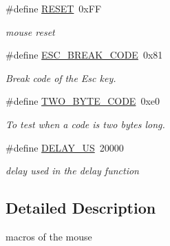 \begin{DoxyCompactItemize}
\mbox{\label{group__mouse__macros_gab702106cf3b3e96750b6845ded4e0299}} 
\#define \hyperlink{group__mouse__macros_gab702106cf3b3e96750b6845ded4e0299}{R\+E\+S\+ET}~0x\+FF
\begin{DoxyCompactList}\small\item\em mouse reset \end{DoxyCompactList}\item 
\mbox{\label{group__mouse__macros_ga592dfdf397b21913348b4dd6b7759b2d}} 
\#define \hyperlink{group__mouse__macros_ga592dfdf397b21913348b4dd6b7759b2d}{E\+S\+C\+\_\+\+B\+R\+E\+A\+K\+\_\+\+C\+O\+DE}~0x81
\begin{DoxyCompactList}\small\item\em Break code of the Esc key. \end{DoxyCompactList}\item 
\mbox{\label{group__mouse__macros_ga2877405e9b042d1e29cc09bcc8daccfa}} 
\#define \hyperlink{group__mouse__macros_ga2877405e9b042d1e29cc09bcc8daccfa}{T\+W\+O\+\_\+\+B\+Y\+T\+E\+\_\+\+C\+O\+DE}~0xe0
\begin{DoxyCompactList}\small\item\em To test when a code is two bytes long. \end{DoxyCompactList}\item 
\mbox{\label{group__mouse__macros_ga1a522aa19bcb695a9df30032a893bee3}} 
\#define \hyperlink{group__mouse__macros_ga1a522aa19bcb695a9df30032a893bee3}{D\+E\+L\+A\+Y\+\_\+\+US}~20000
\begin{DoxyCompactList}\small\item\em delay used in the delay function \end{DoxyCompactList}\end{DoxyCompactItemize}


\subsection{Detailed Description}
macros of the mouse 